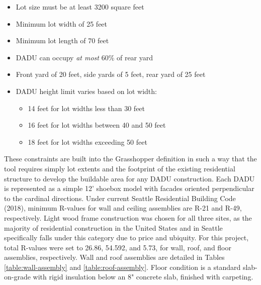 \documentclass[sagev,times,Royal]{sagej}
\begin{document}
\begin{itemize}
	\item Lot size must be at least 3200 square feet
	\item Minimum lot width of 25 feet
	\item Minimum lot length of 70 feet
	\item DADU can occupy \textit{at most} 60\% of rear yard	
	\item Front yard of 20 feet, side yards of 5 feet, rear yard of 25  feet
	\item DADU height limit varies based on lot width: \begin{itemize}
	\item 14 feet for lot widths less than 30 feet
	\item 16 feet for lot widths between 40 and 50 feet
	\item 18 feet for lot widths exceeding 50 feet \end{itemize}
\label{zoning-restrictions}
\end{itemize}

These constraints are built into the Grasshopper definition in such a way that the tool requires simply lot extents and the footprint of the existing residential structure to develop the buildable area for any DADU construction. Each DADU is represented as a simple 12' shoebox model with facades oriented  perpendicular to the cardinal directions. Under current Seattle Residential Building Code (2018), minimum R-values for wall and ceiling assemblies are R-21 and R-49, respectively. Light wood frame construction was chosen for all three sites, as the majority of residential construction in the United States and in Seattle specifically falls under this category due to price and ubiquity. For this project, total R-values were set to 26.86, 54.592, and 5.73, for wall, roof, and floor assemblies, respectively. Wall and roof assemblies are detailed in Tables \ref{table:wall-assembly} and \ref{table:roof-assembly}. Floor condition is a standard slab-on-grade with rigid insulation below an 8" concrete slab, finished with carpeting.
\end{document}
